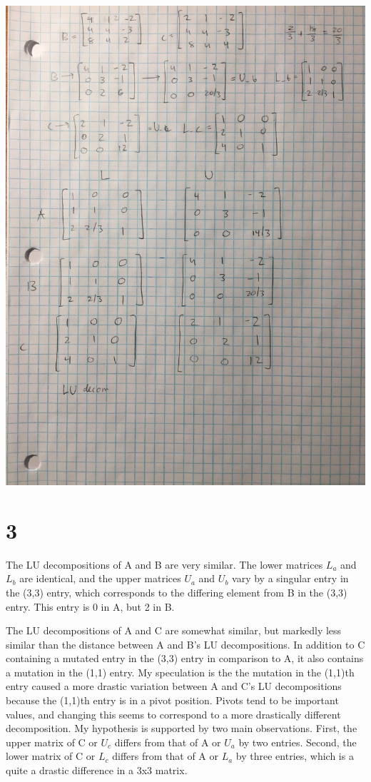 \documentclass[10pt,a4paper]{article}
\begin{document}
\includegraphics[scale=0.10]{LU_2.JPG} \\

\section*{3}

The LU decompositions of A and B are very similar. The lower matrices $ L_a $ and $ L_b $ are identical, and the upper matrices $ U_a $ and $ U_b $ vary by a singular entry in the (3,3) entry, which corresponds to the differing element from B in the (3,3) entry. This entry is 0 in A, but 2 in B.

The LU decompositions of A and C are somewhat similar, but markedly less similar than the distance between A and B’s LU decompositions. In addition to C containing a mutated entry in the (3,3) entry in comparison to A, it also contains a mutation in the (1,1) entry. My speculation is the the mutation in the (1,1)th entry caused a more drastic variation between A and C’s LU decompositions because the (1,1)th entry is in a pivot position. Pivots tend to be important values, and changing this seems to correspond to a more drastically different decomposition. My hypothesis is supported by two main observations. First, the upper matrix of C or $ U_c $ differs from that of A or $ U_a $ by two entries. Second, the lower matrix of C or $ L_c $ differs from that of A or $ L_a $ by three entries, which is a quite a drastic difference in a 3x3 matrix. 
\end{document}
